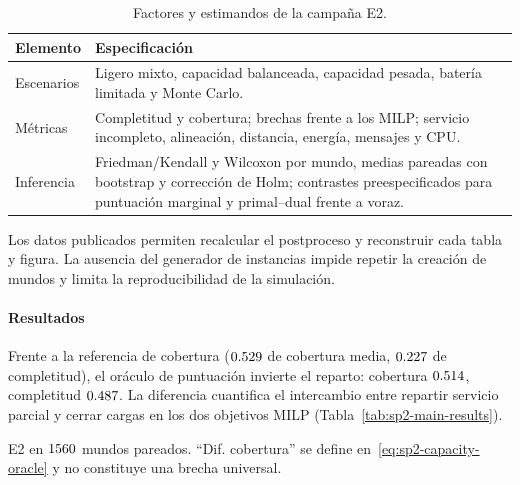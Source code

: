 \begin{table}[!htbp]
  \centering
  \caption{Factores y estimandos de la campaña E2.}
  \label{tab:sp2-design}
  \viutablefont
  \begin{tabularx}{0.94\textwidth}{>{\raggedright\arraybackslash}p{2.5cm} Y}
    \toprule
    Elemento & Especificación \\
    \midrule
    Escenarios & Ligero mixto, capacidad balanceada, capacidad pesada, batería limitada y Monte Carlo. \\
    Métricas & Completitud y cobertura; brechas frente a los MILP; servicio incompleto, alineación, distancia, energía, mensajes y CPU. \\
    Inferencia & Friedman/Kendall y Wilcoxon por mundo, medias pareadas con \mbox{bootstrap} y corrección de Holm; contrastes preespecificados para puntuación marginal y primal--dual frente a voraz. \\
    \bottomrule
  \end{tabularx}
\end{table}

Los datos publicados permiten recalcular el postproceso y reconstruir cada tabla y figura. La ausencia del generador de instancias impide repetir la creación de mundos y limita la reproducibilidad de la simulación.

\paragraph{Resultados}

Frente a la referencia de cobertura ($0.529$ de cobertura media, $0.227$ de completitud), el oráculo de puntuación invierte el reparto: cobertura $0.514$, completitud $0.487$. La diferencia cuantifica el intercambio entre repartir servicio parcial y cerrar cargas en los dos objetivos MILP (Tabla~\ref{tab:sp2-main-results}).

\begin{table}[!htbp]
  \centering
  \caption[E2 en 1560 mundos pareados. Diferencia de cobertura frente al oráculo de cobertura.]{E2 en $\SPTwoWorlds$ mundos pareados. ``Dif. cobertura'' se define en~\eqref{eq:sp2-capacity-oracle} y no constituye una brecha universal.}
  \label{tab:sp2-main-results}
  \resizebox{\textwidth}{!}{}
\end{table}

